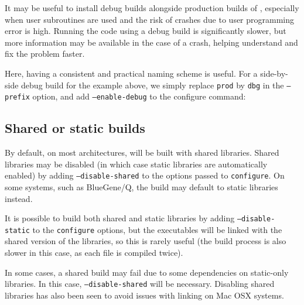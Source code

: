 \documentclass[a4paper,10pt,twoside]{csshortdoc}
\begin{document}
It may be useful to install debug builds alongside production
builds of \CS, especially when user subroutines are used
and the risk of crashes due to user programming error is high.
Running the code using a debug build is significantly
slower, but more information may be available in the case
of a crash, helping understand and fix the problem faster.

Here, having a consistent and practical naming scheme is useful.
For a side-by-side debug build for the example above, we simply replace \texttt{prod} by
\texttt{dbg} in the \texttt{--prefix} option, and add
\texttt{--enable-debug} to the configure command:


\subsection{Shared or static builds\label{sec:config:shared}}

By default, on most architectures, \CS will be built with shared libraries.
Shared libraries may be disabled (in which case static libraries
are automatically enabled) by adding  {\tt --disable-shared} to the options
passed to {\tt configure}.
On some systems, such as BlueGene/Q, the build may default to static libraries
instead.

It is possible to build both shared and static libraries by adding
{\tt --disable-static} to the {\tt configure} options, but the
executables will be linked with the shared version of the libraries,
so this is rarely useful (the build process is also slower in this case, as
each file is compiled twice).

In some cases, a shared build may fail due to some dependencies
on static-only libraries. In this case, {\tt --disable-shared}
will be necessary. Disabling shared libraries has also been seen
to avoid issues with linking on Mac OSX systems.
\end{document}
